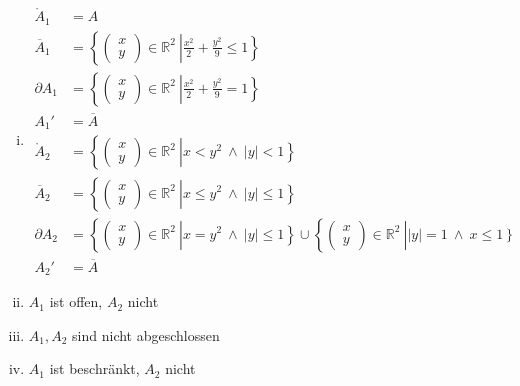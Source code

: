 \documentclass[11pt,a4paper]{article}
\newcommand {\Rzwei}	{\mathbb{R}^2}
\newcommand{\1}    	{\mathbbm{1}}
\begin{document}
	\begin{enumerate}[i.)]
		\item
		\begin{align*}
			\mathring{A}_1 &= A \\
			\overline{A}_1 &= \left\{ \left( \begin{array}{c} x \\ y\end{array} \right) \in \Rzwei ~\right\vert \left.
			\frac{x^2}{2} + \frac{y^2}{9} \leqslant 1 \right\} \\
			\partial A_1 &= \left\{ \left( \begin{array}{c} x \\ y\end{array} \right) \in \Rzwei ~\right\vert \left.
			\frac{x^2}{2} + \frac{y^2}{9} = 1 \right\} \\
			A_1' &= \overline{A} \\
			\mathring{A}_2 &= \left\{ \left( \begin{array}{c} x \\ y\end{array} \right) \in \Rzwei ~\right\vert \left. x < y^2 ~\land~ \vert y \vert < 1 \right\} \\
			\overline{A}_2 &= \left\{ \left( \begin{array}{c} x \\ y\end{array} \right) \in \Rzwei ~\right\vert \left. x \leqslant y^2 ~\land~ \vert y \vert \leqslant 1 \right\} \\
			\partial A_2 &= 
			\left\{ \left( \begin{array}{c} x \\ y\end{array} \right) \in \Rzwei ~\right\vert \left. x = y^2 ~\land~ \vert y \vert \leqslant 1 \right\} \cup 
			\left\{ \left( \begin{array}{c} x \\ y\end{array} \right) \in \Rzwei ~\right\vert \left. \vert y \vert = 1 ~\land~ x \leqslant 1 \right\} \\
			A_2' &= \overline{A}
		\end{align*}
		\item \(A_1\) ist offen, \(A_2\) nicht
		\item \(A_1, A_2\) sind nicht abgeschlossen
		\item \(A_1\) ist beschränkt, \(A_2\) nicht
	\end{enumerate}
	
\end{document}
